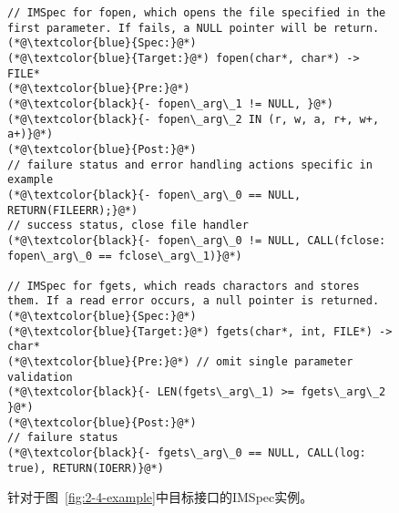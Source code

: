 \begin{figure}[t]
	\centering
	\begin{lstlisting}
// IMSpec for fopen, which opens the file specified in the first parameter. If fails, a NULL pointer will be return.
(*@\textcolor{blue}{Spec:}@*)
(*@\textcolor{blue}{Target:}@*) fopen(char*, char*) -> FILE*
(*@\textcolor{blue}{Pre:}@*) 
(*@\textcolor{black}{- fopen\_arg\_1 != NULL, }@*)
(*@\textcolor{black}{- fopen\_arg\_2 IN (r, w, a, r+, w+, a+)}@*)
(*@\textcolor{blue}{Post:}@*) 
// failure status and error handling actions specific in example
(*@\textcolor{black}{- fopen\_arg\_0 == NULL, RETURN(FILEERR);}@*)
// success status, close file handler
(*@\textcolor{black}{- fopen\_arg\_0 != NULL, CALL(fclose: fopen\_arg\_0 == fclose\_arg\_1)}@*)

// IMSpec for fgets, which reads charactors and stores them. If a read error occurs, a null pointer is returned.
(*@\textcolor{blue}{Spec:}@*)
(*@\textcolor{blue}{Target:}@*) fgets(char*, int, FILE*) -> char*
(*@\textcolor{blue}{Pre:}@*) // omit single parameter validation
(*@\textcolor{black}{- LEN(fgets\_arg\_1) >= fgets\_arg\_2 }@*)
(*@\textcolor{blue}{Post:}@*)
// failure status 
(*@\textcolor{black}{- fgets\_arg\_0 == NULL, CALL(log: true), RETURN(IOERR)}@*)
	\end{lstlisting}
	\caption{
		针对于图~\ref{fig:2-4-example}中目标接口的IMSpec实例。
	}
	\label{fig:2-4-example-imspec}
\end{figure}
